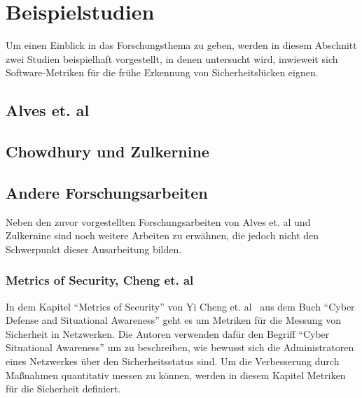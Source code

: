 \section{Beispielstudien}
\label{sec:studien}
Um einen Einblick in das Forschungsthema zu geben, werden in diesem Abschnitt zwei Studien beispielhaft vorgestellt, in denen untersucht wird, inwieweit sich Software-Metriken für die frühe Erkennung von Sicherheitslücken eignen.


\subsection{Alves et. al}

\subsection{Chowdhury und Zulkernine}

\subsection{Andere Forschungsarbeiten}
Neben den zuvor vorgestellten Forschungsarbeiten von Alves et. al und Zulkernine sind noch weitere Arbeiten zu erwähnen, die jedoch nicht den Schwerpunkt dieser Ausarbeitung bilden.

\subsubsection{Metrics of Security, Cheng et. al}
In dem Kapitel "`Metrics of Security"' von Yi Cheng et. al~\cite{cheng2014} aus dem Buch "`Cyber Defense and Situational Awareness"' geht es um Metriken für die Messung von Sicherheit in Netzwerken.
Die Autoren verwenden dafür den Begriff "`Cyber Situational Awareness"' um zu beschreiben, wie bewusst sich die Administratoren eines Netzwerkes über den Sicherheitsstatus sind.
Um die Verbesserung durch Maßnahmen quantitativ messen zu können, werden in diesem Kapitel Metriken für die Sicherheit definiert.
